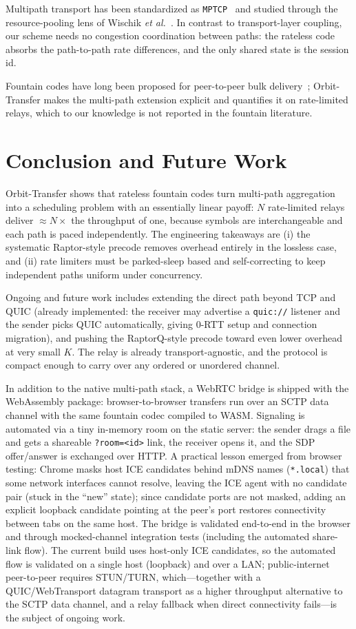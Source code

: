 \documentclass[conference]{IEEEtran}
\begin{document}
Multipath transport has been standardized as
\texttt{MPTCP}~\cite{rfc6824} and studied through the resource-pooling lens of
Wischik \emph{et al.}~\cite{wischik2008survey}. In contrast to transport-layer
coupling, our scheme needs no congestion coordination between paths: the
rateless code absorbs the path-to-path rate differences, and the only shared
state is the session id.

Fountain codes have long been proposed for peer-to-peer bulk
delivery~\cite{maymounkov2002online}; Orbit-Transfer makes the multi-path
extension explicit and quantifies it on rate-limited relays, which to our
knowledge is not reported in the fountain literature.

\section{Conclusion and Future Work}
Orbit-Transfer shows that rateless fountain codes turn multi-path aggregation
into a scheduling problem with an essentially linear payoff: $N$ rate-limited
relays deliver $\approx N\times$ the throughput of one, because symbols are
interchangeable and each path is paced independently. The engineering
takeaways are (i) the systematic Raptor-style precode removes overhead entirely
in the lossless case, and (ii) rate limiters must be parked-sleep based and
self-correcting to keep independent paths uniform under concurrency.

Ongoing and future work includes extending the direct path beyond TCP and QUIC
(already implemented: the receiver may advertise a \texttt{quic://} listener and
the sender picks QUIC automatically, giving 0-RTT setup and connection
migration), and pushing the RaptorQ-style precode toward even lower overhead at
very small $K$. The relay is already transport-agnostic, and the protocol is
compact enough to carry over any ordered or unordered channel.

In addition to the native multi-path stack, a WebRTC bridge is shipped with the
WebAssembly package: browser-to-browser transfers run over an SCTP data channel
with the same fountain codec compiled to WASM. Signaling is automated via a
tiny in-memory room on the static server: the sender drags a file and gets a
shareable \texttt{?room=<id>} link, the receiver opens it, and the SDP
offer/answer is exchanged over HTTP. A practical lesson emerged from browser
testing: Chrome masks host ICE candidates behind mDNS names
(\texttt{*.local}) that some network interfaces cannot resolve, leaving the
ICE agent with no candidate pair (stuck in the ``new'' state); since candidate
ports are not masked, adding an explicit loopback candidate pointing at the
peer's port restores connectivity between tabs on the same host. The bridge is
validated end-to-end in the browser and through mocked-channel integration
tests (including the automated share-link flow). The current build uses
host-only ICE candidates, so the automated flow is validated on a single host
(loopback) and over a LAN; public-internet peer-to-peer requires STUN/TURN,
which---together with a QUIC/WebTransport datagram transport as a higher
throughput alternative to the SCTP data channel, and a relay fallback when
direct connectivity fails---is the subject of ongoing work.
\end{document}
